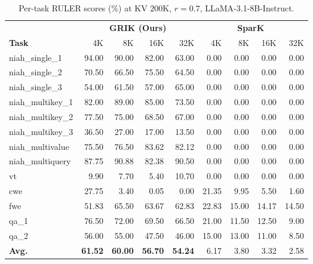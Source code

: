 \documentclass{article}
\begin{document}
\begin{table}[h]
\centering
\footnotesize
\setlength{\tabcolsep}{4pt}
\renewcommand{\arraystretch}{1.10}
\caption{Per-task RULER scores (\%) at KV $200$K, $r{=}0.7$, LLaMA-3.1-8B-Instruct.}
\label{tab:ruler-pertask}
\begin{tabular}{@{}l rrrr rrrr@{}}
\toprule
 & \multicolumn{4}{c}{\textbf{GRIK (Ours)}} & \multicolumn{4}{c}{\textbf{SparK~\citep{spark}}} \\
\cmidrule(lr){2-5} \cmidrule(lr){6-9}
\textbf{Task} & 4K & 8K & 16K & 32K & 4K & 8K & 16K & 32K \\
\midrule
niah\_single\_1     & 94.00 & 90.00 & 82.00 & 63.00 & 0.00 & 0.00 & 0.00 & 0.00 \\
niah\_single\_2     & 70.50 & 66.50 & 75.50 & 64.50 & 0.00 & 0.00 & 0.00 & 0.00 \\
niah\_single\_3     & 54.00 & 61.50 & 57.00 & 65.00 & 0.00 & 0.00 & 0.00 & 0.00 \\
niah\_multikey\_1   & 82.00 & 89.00 & 85.00 & 73.50 & 0.00 & 0.00 & 0.00 & 0.00 \\
niah\_multikey\_2   & 77.50 & 75.00 & 68.50 & 67.00 & 0.00 & 0.00 & 0.00 & 0.00 \\
niah\_multikey\_3   & 36.50 & 27.00 & 17.00 & 13.50 & 0.00 & 0.00 & 0.00 & 0.00 \\
niah\_multivalue    & 75.50 & 76.50 & 83.62 & 82.12 & 0.00 & 0.00 & 0.00 & 0.00 \\
niah\_multiquery    & 87.75 & 90.88 & 82.38 & 90.50 & 0.00 & 0.00 & 0.00 & 0.00 \\
vt                  &  9.90 &  7.70 &  5.40 & 10.70 & 0.00 & 0.00 & 0.00 & 0.00 \\
cwe                 & 27.75 &  3.40 &  0.05 &  0.00 & 21.35 &  9.95 &  5.50 &  1.60 \\
fwe                 & 51.83 & 65.50 & 63.67 & 62.83 & 22.83 & 15.00 & 14.17 & 14.50 \\
qa\_1               & 76.50 & 72.00 & 69.50 & 66.50 & 21.00 & 11.50 & 12.50 &  9.00 \\
qa\_2               & 56.00 & 55.00 & 47.50 & 46.00 & 15.00 & 13.00 & 11.00 &  8.50 \\
\midrule
\textbf{Avg.} & \textbf{61.52} & \textbf{60.00} & \textbf{56.70} & \textbf{54.24} & 6.17 & 3.80 & 3.32 & 2.58 \\
\bottomrule
\end{tabular}
\end{table}
 
 
 
\end{document}
